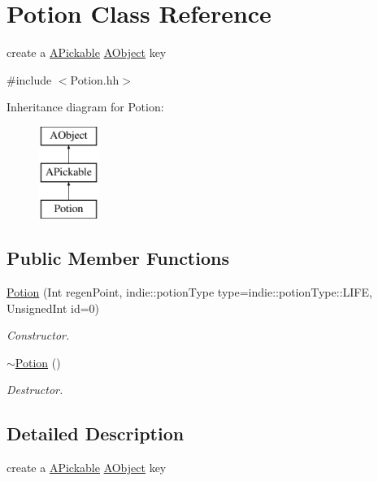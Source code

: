 \hypertarget{classPotion}{}\section{Potion Class Reference}
\label{classPotion}


create a \hyperlink{classAPickable}{A\+Pickable} \hyperlink{classAObject}{A\+Object} key  




{\ttfamily \#include $<$Potion.\+hh$>$}

Inheritance diagram for Potion\+:\begin{figure}[H]
\begin{center}
\leavevmode
\includegraphics[height=3.000000cm]{classPotion}
\end{center}
\end{figure}
\subsection*{Public Member Functions}
\begin{DoxyCompactItemize}
\item 
\hyperlink{classPotion_ae01585e2601f88d03debb1a675d5bc06}{Potion} (Int regen\+Point, indie\+::potion\+Type type=indie\+::potion\+Type\+::\+L\+I\+FE, Unsigned\+Int id=0)
\begin{DoxyCompactList}\small\item\em Constructor. \end{DoxyCompactList}\item 
\hyperlink{classPotion_a8730c8052ec698171885bb5dacda9cca}{$\sim$\+Potion} ()
\begin{DoxyCompactList}\small\item\em Destructor. \end{DoxyCompactList}\end{DoxyCompactItemize}


\subsection{Detailed Description}
create a \hyperlink{classAPickable}{A\+Pickable} \hyperlink{classAObject}{A\+Object} key 

